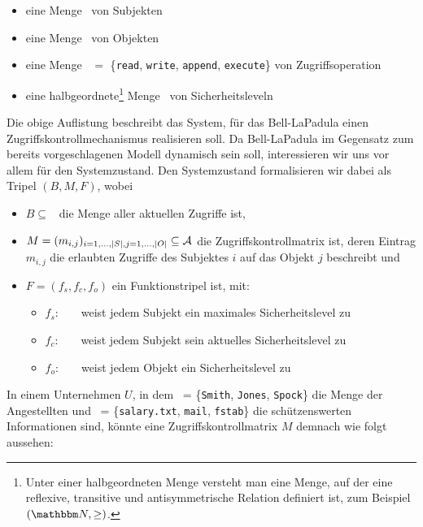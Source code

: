 \begin{itemize}
	\item eine Menge \calS\ von Subjekten 
	\item eine Menge \calO\ von Objekten
	\item eine Menge \calA\ \(=\) \{\texttt{read}, \texttt{write}, \texttt{append}, \texttt{execute}\} von Zugriffsoperation
	\item eine halbgeordnete\footnote{Unter einer halbgeordneten Menge versteht man eine Menge, auf der eine reflexive, transitive und antisymmetrische Relation definiert ist, zum Beispiel \((\N, \geq)\).} Menge \calL\ von Sicherheitsleveln
\end{itemize}

Die obige Auflistung beschreibt das System, für das Bell-LaPadula einen Zugriffskontrollmechanismus realisieren soll. Da Bell-LaPadula im Gegensatz zum bereits vorgeschlagenen Modell dynamisch sein soll, interessieren wir uns vor allem für den Systemzustand. Den Systemzustand formalisieren wir dabei als Tripel \((B,M,F)\), wobei

\begin{itemize}
	\item \(B \subseteq\) \calS \ctsProd \calO \ctsProd \calA\  die Menge aller aktuellen Zugriffe ist,
	\item \(M = (m_{i, j})_{i = 1,...,\vert S \vert, j = 1,...,\vert O \vert} \subseteq \mathcal{A}\) die Zugriffskontrollmatrix ist, deren Eintrag \begin{math} m_{i, j} \end{math} die erlaubten Zugriffe des Subjektes \(i\) auf das Objekt \(j\) beschreibt und
	\item \(F = (f_s, f_c, f_o)\) ein Funktionstripel ist, mit:
	\begin{itemize}
		\item \(f_s:\) \calS\ \rArrow\ \calL\ weist jedem Subjekt ein maximales Sicherheitslevel zu
		\item \(f_c:\) \calS\ \rArrow\ \calL\ weist jedem Subjekt sein aktuelles Sicherheitslevel zu 
		\item \(f_o:\) \calO\ \rArrow\ \calL\ weist jedem Objekt ein Sicherheitslevel zu
	\end{itemize}
\end{itemize}
 
In einem Unternehmen \(U\), in dem \calS\ = \{\texttt{Smith}, \texttt{Jones}, \texttt{Spock}\} die Menge der Angestellten
und \calO\ = \{\texttt{salary.txt}, \texttt{mail}, \texttt{fstab}\} die schützenswerten Informationen sind, könnte
eine Zugriffskontrollmatrix \(M\) demnach wie folgt aussehen:

